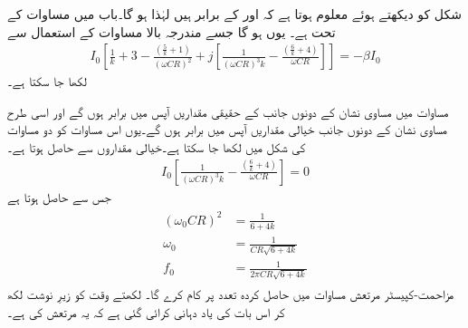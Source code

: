 شکل کو دیکھتے ہوئے معلوم ہوتا ہے کہ  اور  کے برابر ہیں لہٰذا  ہو گا۔باب  میں مساوات  کے تحت  ہے۔ یوں  ہو گا جسے مندرجہ بالا مساوات کے استعمال سے
\begin{align} \label{مساوات_مزاحمت_کپیسٹر_مکمل_مساوت}
I_0 \left[ \frac{1}{k}+3 -\frac{\left(\frac{5}{k}+1 \right )}{\left(\omega C R \right)^2}+j \left [\frac{1}{\left (\omega C R \right)^3 k}  -\frac{\left(\frac{6}{k}+4 \right)}{\omega C R}\right] \right ]=-\beta I_0
\end{align}
لکھا جا سکتا ہے۔

مساوات  میں مساوی نشان کے دونوں جانب کے حقیقی مقداریں آپس میں برابر ہوں گے اور اسی طرح مساوی نشان کے دونوں جانب خیالی مقداریں آپس میں برابر ہوں گے۔یوں اس مساوات کو دو مساوات کی شکل میں لکھا جا سکتا ہے۔خیالی مقداروں سے حاصل ہوتا ہے۔
\begin{align*}
I_0 \left[\frac{1}{\left( \omega C R\right)^3 k }-\frac{\left(\frac{6}{k}+4 \right)}{\omega C R} \right]=0
\end{align*}
جس سے حاصل ہوتا ہے
\begin{gather}
\begin{aligned} \label{مساوات_مزاحمت_کپیسٹر_مرتعش_قدرتی_تعداد_ارتعاش}
\left(\omega_0 C R \right)^2 &=\frac{1}{ {6+4 k}}\\
\omega_0 &= \frac{1}{C R \sqrt {6+4 k}} \\
f_0 &=\frac{1}{2 \pi C R \sqrt{6+4 k}}
\end{aligned}
\end{gather}
مزاحمت-کپیسٹر مرتعش مساوات  میں حاصل کردہ تعدد  پر کام کرے گا۔ لکھتے وقت  کو زیرِ نوشت لکھ کر اس بات کی یاد دہانی کرائی گئی ہے کہ یہ مرتعش کی  ہے۔ 

